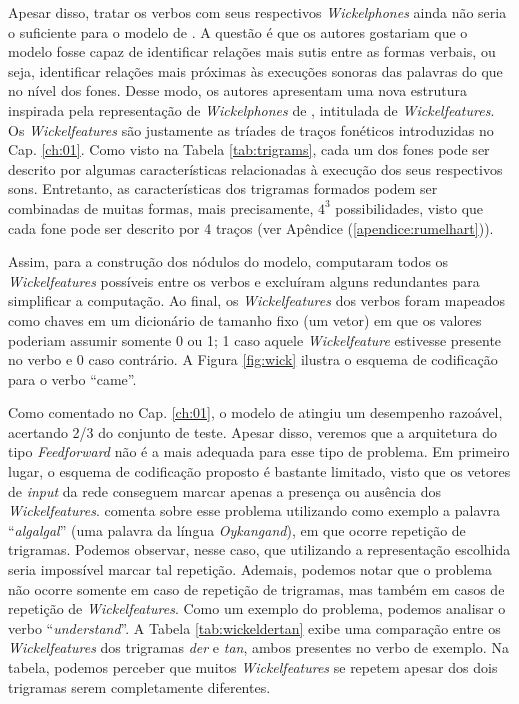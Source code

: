 Apesar disso, tratar os verbos com seus respectivos \textit{Wickelphones} ainda não seria o suficiente para o modelo de \cite{rumelhart:1986}. A questão é que os autores gostariam que o modelo fosse capaz de identificar relações mais sutis entre as formas verbais, ou seja, identificar relações mais próximas às execuções sonoras das palavras do que no nível dos fones. Desse modo, os autores apresentam uma nova estrutura inspirada pela representação de \textit{Wickelphones} de \cite{wickelgren:1969}, intitulada de \textit{Wickelfeatures}. Os \textit{Wickelfeatures} são justamente as tríades de traços fonéticos introduzidas no Cap. \ref{ch:01}. Como visto na Tabela \ref{tab:trigrams}, cada um dos fones pode ser descrito por algumas características relacionadas à execução dos seus respectivos sons. Entretanto, as características dos trigramas formados podem ser combinadas de muitas formas, mais precisamente, $4^{3}$ possibilidades, visto que cada fone pode ser descrito por 4 traços (ver Apêndice (\ref{apendice:rumelhart})). 

Assim, para a construção dos nódulos do modelo, \cite{rumelhart:1986} computaram todos os \textit{Wickelfeatures} possíveis entre os verbos e excluíram alguns redundantes para simplificar a computação. Ao final, os \textit{Wickelfeatures} dos verbos foram mapeados como chaves em um dicionário de tamanho fixo (um vetor) em que os valores poderiam assumir somente 0 ou 1; 1 caso aquele \textit{Wickelfeature} estivesse presente no verbo e 0 caso contrário. A Figura \ref{fig:wick} ilustra o esquema de codificação para o verbo “came”. 



Como comentado no Cap. \ref{ch:01}, o modelo de \cite{rumelhart:1986} atingiu um desempenho razoável, acertando 2/3 do conjunto de teste. Apesar disso, veremos que a arquitetura do tipo \textit{Feedforward} não é a mais adequada para esse tipo de problema. Em primeiro lugar, o esquema de codificação proposto é bastante limitado, visto que os vetores de \textit{input} da rede conseguem marcar apenas a presença ou ausência dos \textit{Wickelfeatures}. \cite{Pinker:1999} comenta sobre esse problema utilizando como exemplo a palavra “\textit{algalgal}” (uma palavra da língua \textit{Oykangand}), em que ocorre repetição de trigramas. Podemos observar, nesse caso, que utilizando a representação escolhida seria impossível marcar tal repetição. Ademais, podemos notar que o problema não ocorre somente em caso de repetição de trigramas, mas também em casos de repetição de \textit{Wickelfeatures}. Como um exemplo do problema, podemos analisar o verbo “\textit{understand}”. A Tabela \ref{tab:wickeldertan} exibe uma comparação entre os \textit{Wickelfeatures} dos trigramas \textit{der} e \textit{tan}, ambos presentes no verbo de exemplo. Na tabela, podemos perceber que muitos \textit{Wickelfeatures} se repetem apesar dos dois trigramas serem completamente diferentes.


